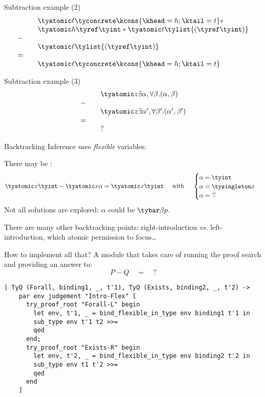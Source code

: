 \documentclass[final,xetex]{beamer}
\begin{document}
\begin{frame}{Subtraction example (2)}
  \[
  \begin{array}{ll}
  & \tyatomic \ell{\tyconcrete \kcons{ \khead = h; \ktail = t }} \ast \\
  &\tyatomic h{\tyref\tyint} \ast \tyatomic t{\tylist {(\tyref\tyint)}} \\
  - \quad \\
  &\tyatomic \ell{\tylist{(\tyref\tyint)}} \\
  =  \quad\\
  &\tyatomic \ell{\tyconcrete \kcons{ \khead = h; \ktail = t }}
\end{array}
  \]
\end{frame}

\begin{frame}{Subtraction example (3)}
 \[
  \begin{array}{ll}
  & \tyatomic z{\exists\alpha, \forall\beta. (\alpha, \beta)} \\
  - \quad \\
  & \tyatomic z{\exists\alpha', \forall\beta'. (\alpha', \beta')} \\
  = \quad \\
  & ?
  \end{array}
\]
\end{frame}

\begin{frame}{Backtracking}
  Inference uses \emph{flexible} variables.

  \bigskip

  There may be :
  \[
  \tyatomic x\tyint - \tyatomic x\alpha =
  \tyatomic x\tyint\quad\text{ with }\quad
  \begin{cases}
    \alpha = \tyint \\
    \alpha = \tysingleton x \\
    \alpha = \top
  \end{cases}
  \]
  Not all solutions are explored: $\alpha$ could be $\tybar\beta p$.

  \bigskip

  There are many other backtracking points: right-introduction \emph{vs.}
  left-introduction, which atomic permission to focus\ldots
\end{frame}

\begin{frame}[fragile]{How to implement all that?}
  A module that takes care of running the proof search and providing an answer
  to:
  \[
  P-Q\quad = \quad?
  \]

  \bigskip

  \begin{verbatim}
| TyQ (Forall, binding1, _, t'1), TyQ (Exists, binding2, _, t'2) ->
    par env judgement "Intro-Flex" [
      try_proof_root "Forall-L" begin
        let env, t'1, _ = bind_flexible_in_type env binding1 t'1 in
        sub_type env t'1 t2 >>=
        qed
      end;
      try_proof_root "Exists-R" begin
        let env, t'2, _ = bind_flexible_in_type env binding2 t'2 in
        sub_type env t1 t'2 >>=
        qed
      end
    ]
  \end{verbatim}
\end{frame}
\end{document}
